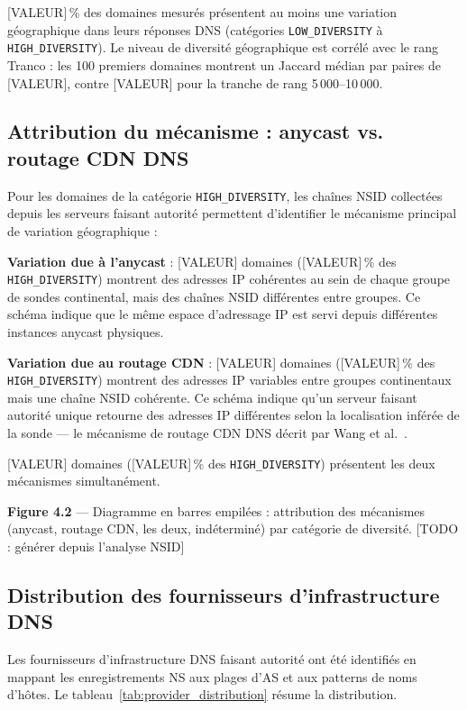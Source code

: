 [VALEUR]\,\% des domaines mesurés présentent au moins une variation géographique dans leurs réponses DNS (catégories \texttt{LOW\_DIVERSITY} à \texttt{HIGH\_DIVERSITY}). Le niveau de diversité géographique est corrélé avec le rang Tranco : les 100 premiers domaines montrent un Jaccard médian par paires de [VALEUR], contre [VALEUR] pour la tranche de rang 5\,000--10\,000.

\subsection{Attribution du mécanisme : anycast vs. routage CDN DNS}
\label{subsec:4.2.2}

Pour les domaines de la catégorie \texttt{HIGH\_DIVERSITY}, les chaînes NSID collectées depuis les serveurs faisant autorité permettent d'identifier le mécanisme principal de variation géographique :

\textbf{Variation due à l'anycast} : [VALEUR] domaines ([VALEUR]\,\% des \texttt{HIGH\_DIVERSITY}) montrent des adresses IP cohérentes au sein de chaque groupe de sondes continental, mais des chaînes NSID différentes entre groupes. Ce schéma indique que le même espace d'adressage IP est servi depuis différentes instances anycast physiques.

\textbf{Variation due au routage CDN} : [VALEUR] domaines ([VALEUR]\,\% des \texttt{HIGH\_DIVERSITY}) montrent des adresses IP variables entre groupes continentaux mais une chaîne NSID cohérente. Ce schéma indique qu'un serveur faisant autorité unique retourne des adresses IP différentes selon la localisation inférée de la sonde --- le mécanisme de routage CDN DNS décrit par Wang et al.~\cite{Wang2018}.

[VALEUR] domaines ([VALEUR]\,\% des \texttt{HIGH\_DIVERSITY}) présentent les deux mécanismes simultanément.

\textbf{Figure 4.2} --- Diagramme en barres empilées : attribution des mécanismes (anycast, routage CDN, les deux, indéterminé) par catégorie de diversité. [TODO : générer depuis l'analyse NSID]

\subsection{Distribution des fournisseurs d'infrastructure DNS}
\label{subsec:4.2.3}

Les fournisseurs d'infrastructure DNS faisant autorité ont été identifiés en mappant les enregistrements NS aux plages d'AS et aux patterns de noms d'hôtes. Le tableau~\ref{tab:provider_distribution} résume la distribution.

